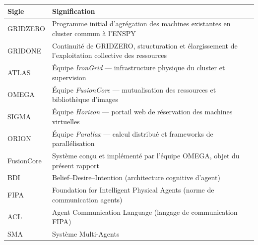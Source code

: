 \documentclass[
    language=french,
    school=estg,
    docstage=final,
    media=paper,
    bookprint=false,
    linkcolor=red!45!black,
    chapterstyle=classic,
    coverstyle=classic,
    aiacknowledgement=false,
    listprefix=false
]{IPLeiriaThesis}
\theoremstyle{definition}
\theoremstyle{plain}
\begin{document}
\begin{longtable}{lp{11cm}}
\toprule
\textbf{Sigle} & \textbf{Signification} \\
\midrule
\endhead
GRIDZERO    & Programme initial d'agrégation des machines existantes en cluster commun à l'ENSPY \\
GRIDONE     & Continuité de GRIDZERO, structuration et élargissement de l'exploitation collective des ressources \\
ATLAS       & Équipe \emph{IronGrid} --- infrastructure physique du cluster et supervision \\
OMEGA       & Équipe \emph{FusionCore} --- mutualisation des ressources et bibliothèque d'images \\
SIGMA       & Équipe \emph{Horizon} --- portail web de réservation des machines virtuelles \\
ORION       & Équipe \emph{Parallax} --- calcul distribué et frameworks de parallélisation \\
FusionCore  & Système conçu et implémenté par l'équipe OMEGA, objet du présent rapport \\
BDI         & Belief--Desire--Intention (architecture cognitive d'agent) \\
FIPA        & Foundation for Intelligent Physical Agents (norme de communication agents) \\
ACL         & Agent Communication Language (langage de communication FIPA) \\
SMA         & Système Multi-Agents \\
\bottomrule
\end{longtable}

\acronymtoc\printacronymglossary

\symboltoc\printsymbolglossary











\printbibliography[title={Bibliographie},heading=bibintoc]


\appendix




\end{document}
